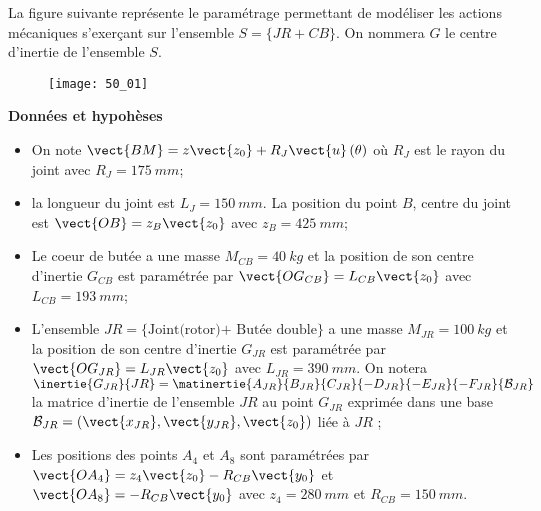 \normaltrue \difficilefalse \tdifficilefalse
\correctionfalse


\setcounter{question}{0}
\ifcorrection
\else
{}
\fi




\ifprof
\else
La figure suivante représente le paramétrage permettant de modéliser les actions mécaniques
s’exerçant sur l’ensemble $S=\{JR+CB\}$. On nommera $G$ le centre d’inertie de l’ensemble
$S$.


\begin{figure}[H]
\centering
\texttt{[image: 50\_01]}
\end{figure}

\textbf{Données et hypohèses}

\begin{itemize}
\item On note $\vect{BM}=z\vect{z_0}+R_J\vect{u}\left(\theta\right)$ où $R_J$ est le rayon du joint avec $R_J = \SI{175}{mm}$;
\item la longueur du joint est $L_J = \SI{150}{mm}$. La position du point $B$, centre du joint est $\vect{OB}=z_B\vect{z_0}$ avec $z_B = \SI{425}{mm}$;
\item Le coeur de butée a une masse $M_{CB} = \SI{40}{kg}$ et la position de son centre d’inertie $G_{CB}$ est paramétrée par $\vect{OG_{CB}}= L_{CB}\vect{z_0}$ avec $L_{CB} = \SI{193}{mm}$;
\item L’ensemble $JR=\{\text{Joint(rotor)+ Butée double}\}$ a une masse $M_{JR} = \SI{100}{kg}$ et la
position de son centre d’inertie $G_{JR}$ est paramétrée par $\vect{OG_{JR}}=L_{JR}\vect{z_0}$ avec $L_{JR}=
\SI{390}{mm}$. On notera $\inertie{G_{JR}}{JR} = \matinertie{A_{JR}}{B_{JR}}{C_{JR}}{-D_{JR}}{-E_{JR}}{-F_{JR}}{\mathcal{B}_{JR}}$ la matrice d’inertie de l’ensemble $JR$ au point $G_{JR}$ exprimée dans une base $\mathcal{B}_{JR} = \left(\vect{x_{JR}},\vect{y_{JR}},\vect{z_{0}}\right)$ liée à $JR$ ;
\item Les positions des points $A_4$ et $A_8$ sont paramétrées par $\vect{OA_4} = z_4\vect{z_0}-R_{CB}\vect{y_0}$ et
$\vect{OA_8}=-R_{CB}\vect{y_0}$ avec $z_4 = \SI{280}{mm}$ et $R_{CB}=\SI{150}{mm}$.
\end{itemize}



